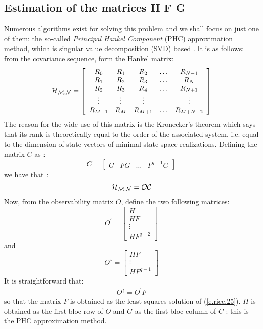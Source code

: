 \subsection{Estimation of the matrices H F G}
Numerous algorithms exist for solving this problem and we shall focus 
on just one of them: the so-called {\em Principal Hankel Component} (PHC)
\cite{kung} 
approximation method, which is singular value decomposition (SVD) based 
. 
It is as follows: from the covariance sequence, form the Hankel matrix:\\
\begin{equation}
\cal{H}_{M,N}=\left[ \begin{array}[c]{ccccc}
R_0 & R_1 & R_2 & \ldots & R_{N-1}\\
R_1 & R_2 & R_3 & \ldots & R_{N}\\
R_2 & R_3 & R_4 & \ldots & R_{N+1}\\
\vdots & \vdots & \vdots &  & \vdots\\
R_{M-1} & R_{M} & R_{M+1} & \ldots & R_{M+N-2} \end{array} \right]
\label{e.ricc.20}
\end{equation}
The reason for the wide use of this matrix is the Kronecker's
theorem which says that its rank is theoretically equal to the order of the 
associated system, i.e. equal to the dimension of state-vectors
of minimal state-space realizations.
Defining the matrix $C$ as :
\begin{equation}
C=\left[ \begin{array}{cccc}
G & FG & \ldots & F^{q-1}G\end{array}\right]
\label{e.ricc.21}
\end{equation}
we have that :
\begin{eqnarray}
\cal{H}_{M,N}=OC
\label{e.ricc.22}
\end{eqnarray}
Now, from the observability matrix $O$, define the two following matrices: 
\begin{equation}
O^{'}=\left[ \begin{array}{c}H\\HF\\ \vdots\\ HF^{q-2}\end{array}\right]
\label{e.ricc.23}
\end{equation}
and
\begin{equation}
O^{\uparrow}=\left[ \begin{array}{c}HF\\ \vdots \\HF^{q-1}\end{array}\right]
\label{e.ricc.24}
\end{equation}
It is straightforward that: 
\begin{eqnarray}
O^{\uparrow}=O^{'}F
\label{e.ricc.25}
\end{eqnarray}
so that the matrix $F$ is obtained as the least-squares solution of
(\ref{e.ricc.25}). $H$ is obtained as the first bloc-row of $O$ and $G$ 
as the first bloc-column of $C$ : this is the PHC approximation method.

